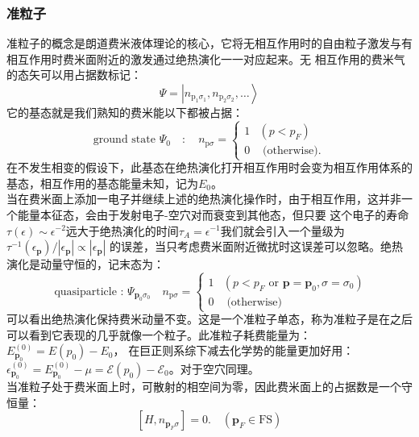 \documentclass[10pt,openany]{book}
\theoremstyle{thmstyle} %
\theoremstyle{defstyle} %
\theoremstyle{prostyle} %
\begin{document}
\subsubsection{准粒子}
准粒子的概念是朗道费米液体理论的核心，它将无相互作用时的自由粒子激发与有相互作用时费米面附近的激发通过绝热演化一一对应起来。无
相互作用的费米气的态矢可以用占据数标记：
\begin{equation}
	\Psi=\left|n_{\mathrm{p}_1 \sigma_1}, n_{\mathrm{p}_2 \sigma_2}, \ldots\right\rangle
\end{equation}
它的基态就是我们熟知的费米能以下都被占据：
\begin{equation}
	\text { ground state } \Psi_0 \quad: \quad n_{\mathrm{p} \sigma}= \begin{cases}1 & \left(p<p_F\right) \\ 0 & \text { (otherwise). }\end{cases}
\end{equation}
在不发生相变的假设下，此基态在绝热演化打开相互作用时会变为相互作用体系的基态，相互作用的基态能量未知，记为$ E_0 $。\\
当在费米面上添加一电子并继续上述的绝热演化操作时，由于相互作用，这并非一个能量本征态，会由于发射电子-空穴对而衰变到其他态，但只要
这个电子的寿命$ \tau(\epsilon) \sim \epsilon^{-2} $远大于绝热演化的时间$ \tau_A=\epsilon^{-1} $我们就会引入一个量级为$ \tau^{-1}\left(\epsilon_{\mathbf{p}}\right) /\left|\epsilon_{\mathbf{p}}\right| \propto\left|\epsilon_{\mathbf{p}}\right| $
的误差，当只考虑费米面附近微扰时这误差可以忽略。绝热演化是动量守恒的，记末态为：
\begin{equation}
	\text { quasiparticle : } \Psi_{\mathbf{p}_0 \sigma_0} \quad n_{\mathrm{p} \sigma}= \begin{cases}1 & \left(p<p_F \text { or } \mathbf{p}=\mathbf{p}_0, \sigma=\sigma_0\right) \\ 0 & \text { (otherwise) }\end{cases}
\end{equation}    
可以看出绝热演化保持费米动量不变。这是一个准粒子单态，称为准粒子是在之后可以看到它表现的几乎就像一个粒子。此准粒子耗费能量为：$ E_{\mathbf{p}_0}^{(0)}=E\left(p_0\right)-E_0 $，
在巨正则系综下减去化学势的能量更加好用：$ \epsilon_{\mathbf{p}_0}^{(0)}=E_{\mathbf{p}_0}^{(0)}-\mu=\mathcal{E}\left(p_0\right)-\mathcal{E}_0 $。对于空穴同理。\\
当准粒子处于费米面上时，可散射的相空间为零，因此费米面上的占据数是一个守恒量：
\begin{equation}
	\left[H, n_{\mathbf{p}_F \sigma}\right]=0 . \quad\left(\mathbf{p}_F \in \mathrm{FS}\right)
\end{equation}  
\end{document}
